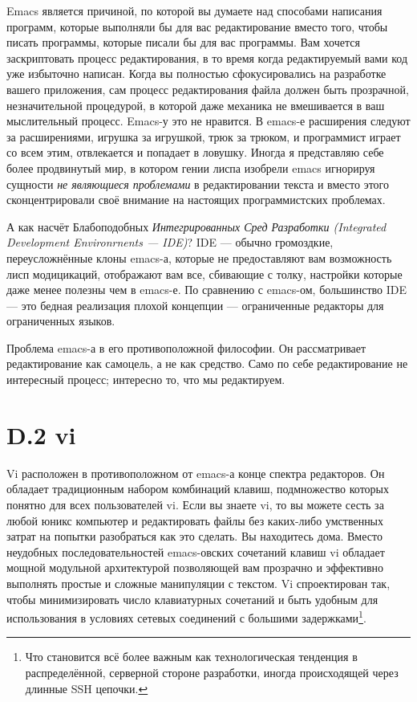 Emacs является причиной, по которой вы думаете над способами написания программ, которые выполняли бы для вас редактирование вместо того, чтобы писать программы, которые писали бы для вас программы. Вам хочется заскриптовать процесс редактирования, в то время когда редактируемый вами код уже избыточно написан. Когда вы полностью сфокусировались на разработке вашего приложения, сам процесс редактирования файла должен быть прозрачной, незначительной процедурой, в которой даже механика не вмешивается в ваш мыслительный процесс. Emacs-у это не нравится. В emacs-е расширения следуют за расширениями, игрушка за игрушкой, трюк за трюком, и программист играет со всем этим, отвлекается и попадает в ловушку. Иногда я представляю себе более продвинутый мир, в котором гении лиспа изобрели emacs игнорируя сущности \emph{не являющиеся проблемами} в редактировании текста и вместо этого сконцентрировали своё внимание на настоящих программистских проблемах.

А как насчёт Блабоподобных \emph{Интегрированных Сред Разработки ({Integrated Development Environrnents} --- IDE)}? IDE --- обычно громоздкие, переусложнённые клоны emacs-а, которые не предоставляют вам возможность лисп модицикаций, отображают вам все, сбивающие с толку, настройки которые даже менее полезны чем в emacs-е. По сравнению с emacs-ом, большинство IDE --- это бедная реализация плохой концепции --- ограниченные редакторы для ограниченных языков.

Проблема emacs-а в его противоположной философии. Он рассматривает редактирование как самоцель, а не как средство. Само по себе редактирование не интересный процесс; интересно то, что мы редактируем.

\section*{D.2 vi}


Vi расположен в противоположном от emacs-а конце спектра редакторов. Он обладает традиционным набором комбинаций клавиш, подмножество которых понятно для всех пользователей vi. Если вы знаете vi, то вы можете сесть за любой юникс компьютер и редактировать файлы без каких-либо умственных затрат на попытки разобраться как это сделать. Вы находитесь дома. Вместо неудобных последовательностей emacs-овских сочетаний клавиш vi обладает мощной модульной архитектурой позволяющей вам прозрачно и эффективно выполнять простые и сложные манипуляции с текстом. Vi спроектирован так, чтобы минимизировать число клавиатурных сочетаний и быть удобным для использования в условиях сетевых соединений с большими задержками\footnote[1]{Что становится всё более важным как технологическая тенденция в распределённой, серверной стороне разработки, иногда происходящей через длинные SSH цепочки.}.

